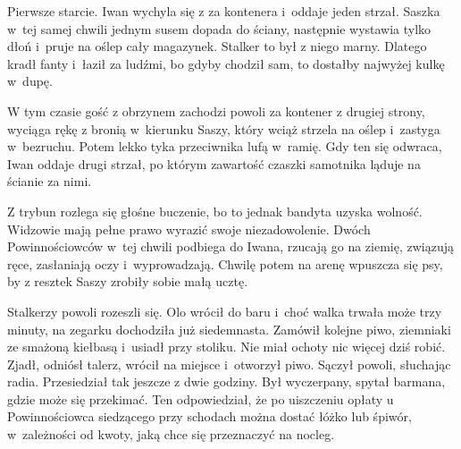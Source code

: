 \documentclass[../MAIN.tex]{subfiles}
\begin{document}
Pierwsze starcie. Iwan wychyla się z za kontenera i~oddaje jeden strzał. Saszka w~tej samej chwili jednym susem dopada do ściany, następnie wystawia tylko dłoń i~pruje na oślep cały magazynek. Stalker to był z niego marny. Dlatego kradł fanty i~łaził za ludźmi, bo gdyby chodził sam, to dostałby najwyżej kulkę w~dupę.


W tym czasie gość z obrzynem zachodzi powoli za kontener z drugiej strony, wyciąga rękę z bronią w~kierunku Saszy, który wciąż strzela na oślep i~zastyga w~bezruchu. Potem lekko tyka przeciwnika lufą w~ramię. Gdy ten się odwraca, Iwan oddaje drugi strzał, po którym zawartość czaszki samotnika ląduje na ścianie za nimi.

Z trybun rozlega się głośne buczenie, bo to jednak bandyta uzyska wolność. Widzowie mają pełne prawo wyrazić swoje niezadowolenie. Dwóch Powinnościowców w~tej chwili podbiega do Iwana, rzucają go na ziemię, związują ręce, zasłaniają oczy i~wyprowadzają. Chwilę potem na arenę wpuszcza się psy, by z resztek Saszy zrobiły sobie małą ucztę.%

Stalkerzy powoli rozeszli się. Olo wrócił do baru i~choć walka trwała może trzy minuty, na zegarku dochodziła już siedemnasta. Zamówił kolejne piwo, ziemniaki ze smażoną kiełbasą i~usiadł przy stoliku. Nie miał ochoty nic więcej dziś robić. Zjadł, odniósł talerz, wrócił na miejsce i~otworzył piwo. Sączył powoli, słuchając radia. Przesiedział tak jeszcze z dwie godziny. Był wyczerpany, spytał barmana, gdzie może się przekimać. Ten odpowiedział, że po uiszczeniu opłaty u Powinnościowca siedzącego przy schodach można dostać łóżko lub śpiwór, w~zależności od kwoty, jaką chce się przeznaczyć na nocleg.
\end{document}
